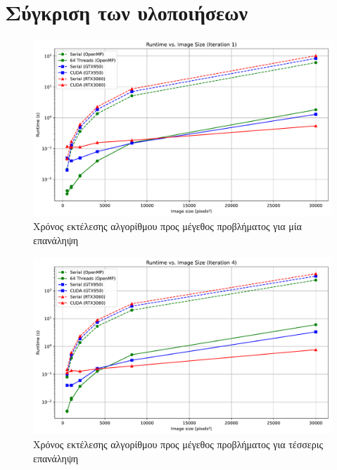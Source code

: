 \section{Σύγκριση των υλοποιήσεων}

\begin{figure}[H]
    \centering
    \includegraphics[width=\linewidth]{./pics/runtimeCurves_1.pdf}
    \caption{Χρόνος εκτέλεσης αλγορίθμου προς μέγεθος προβλήματος για μία επανάληψη}
\end{figure}

\begin{figure}[H]
    \centering
    \includegraphics[width=\linewidth]{./pics/runtimeCurves_4.pdf}
    \caption{Χρόνος εκτέλεσης αλγορίθμου προς μέγεθος προβλήματος για τέσσερις επανάληψη}
\end{figure}

